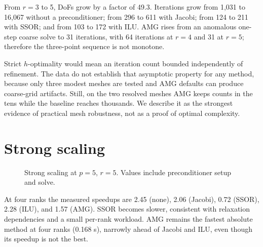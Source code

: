 \documentclass[10pt,a4paper]{article}
\newcommand{\methodstyle}[2]{\addplot+[thick,mark=#1,color=#2]}
\begin{document}
From $r=3$ to 5, DoFs grow by a factor of 49.3. Iterations grow from 1,031 to 16,067 without a
preconditioner; from 296 to 611 with Jacobi; from 124 to 211 with SSOR; and from 103 to 172 with
ILU. AMG rises from an anomalous one-step coarse solve to 31 iterations, with 64 iterations at
$r=4$ and 31 at $r=5$; therefore the three-point sequence is not monotone.

Strict $h$-optimality would mean an iteration count bounded independently of refinement. The data
do not establish that asymptotic property for any method, because only three modest meshes are
tested and AMG defaults can produce coarse-grid artifacts. Still, on the two resolved meshes AMG
keeps counts in the tens while the baseline reaches thousands. We describe it as the strongest
evidence of practical mesh robustness, not as a proof of optimal complexity.

\newpage
\section{Strong scaling}
\begin{figure}[h]
\centering
{}
\caption{Strong scaling at $p=5$, $r=5$. Values include preconditioner setup and solve.}
\label{fig:scaling}
\end{figure}

At four ranks the measured speedups are 2.45 (none), 2.06 (Jacobi), 0.72 (SSOR), 2.28 (ILU),
and 1.57 (AMG). SSOR becomes slower, consistent with relaxation dependencies and a small
per-rank workload. AMG remains the fastest absolute method at four ranks (0.168 s), narrowly ahead
of Jacobi and ILU, even though its speedup is not the best.
\end{document}

